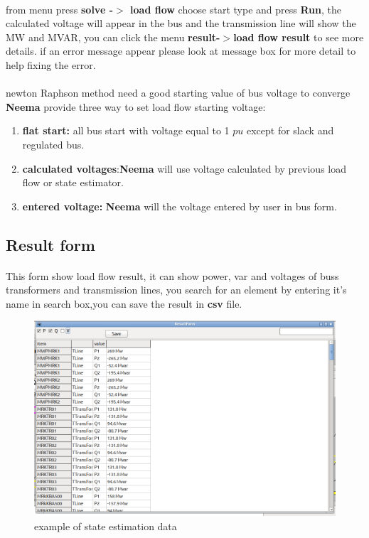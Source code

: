 \documentclass{article}
\begin{document}
\paragraph{}from menu press \textbf{solve -$>$ load flow} choose start type and press \textbf{Run}, the calculated voltage will appear in the bus and the transmission line will show the MW and MVAR, you can click the menu \textbf{result-$>$load flow result} to see more details. if an error message appear please look at message box for more detail to help fixing the error.
\paragraph{} newton Raphson method need a good starting value of bus voltage to converge \textbf{Neema} provide three way to set load flow starting voltage:\begin{enumerate}
\item \textbf{flat start:} all bus start with voltage equal to 1 $pu$ except for slack and regulated bus.
\item \textbf{calculated voltages}:\textbf{Neema} will use voltage calculated by previous load flow or state estimator. 
\item \textbf{entered voltage:} \textbf{Neema} will the voltage entered by user in bus form.
\end{enumerate} 
\subsection{Result form}
\paragraph{}This form show load flow result, it can show power, var and voltages of buss transformers and transmission lines, you search for an element by entering it's name in search box,you can save the result in \textbf{csv} file.
\begin{figure}[H]
	\includegraphics[width=12cm]{resultform.png}
	\caption{example of state estimation data}
	\label{fig:resultform}
\end{figure}
\newpage
\end{document}
